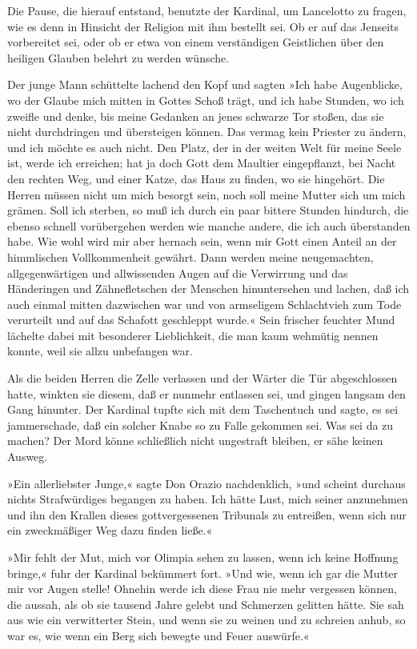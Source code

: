 \pagenum{[63]}Die Pause, die hierauf entstand, benutzte der
Kardinal, um Lancelotto zu fragen, wie es denn in Hinsicht der
Religion mit ihm bestellt sei. Ob er auf das Jenseits vorbereitet
sei, oder ob er etwa von einem verständigen Geistlichen über den
heiligen Glauben belehrt zu werden wünsche.

Der junge Mann schüttelte lachend den Kopf und sagten »Ich habe
Augenblicke, wo der Glaube mich mitten in Gottes Schoß trägt, und
ich habe Stunden, wo ich zweifle und denke, bis meine Gedanken an
jenes schwarze Tor stoßen, das sie nicht durchdringen und
übersteigen können. Das vermag kein Priester zu ändern, und ich
möchte es auch nicht. Den Platz, der in der weiten Welt für meine
Seele ist, werde ich erreichen; hat ja doch Gott dem Maultier
eingepflanzt, bei Nacht den rechten Weg, und einer Katze, das Haus
zu finden, wo sie hingehört. Die Herren müssen nicht um mich
besorgt sein, noch soll meine Mutter sich um mich grämen. Soll ich
sterben, so muß ich durch ein paar bittere Stunden hindurch, die
ebenso schnell vorübergehen werden wie manche andere, die ich auch
überstanden habe. Wie wohl wird mir aber hernach sein, wenn mir
Gott einen Anteil an der himmlischen Vollkommenheit gewährt. Dann
werden meine neugemachten, allgegenwärtigen und allwissenden Augen
auf die Verwirrung und das Händeringen und Zähnefletschen der
Menschen hinuntersehen und lachen, daß ich auch einmal mitten
dazwischen war und von armseligem Schlachtvieh zum Tode verurteilt
und auf das Schafott geschleppt wurde.« Sein frischer feuchter Mund
lächelte dabei mit besonderer Lieblichkeit, die man kaum wehmütig
nennen konnte, weil sie allzu unbefangen war.

Als die beiden Herren die Zelle verlassen und der Wärter die Tür
abgeschlossen hatte, winkten sie diesem, daß er\pagenum{[64]}
nunmehr entlassen sei, und gingen langsam den Gang hinunter. Der
Kardinal tupfte sich mit dem Taschentuch und sagte, es sei
jammerschade, daß ein solcher Knabe so zu Falle gekommen sei. Was
sei da zu machen? Der Mord könne schließlich nicht ungestraft
bleiben, er sähe keinen Ausweg.

»Ein allerliebster Junge,« sagte Don Orazio nachdenklich, »und
scheint durchaus nichts Strafwürdiges begangen zu haben. Ich hätte
Lust, mich seiner anzunehmen und ihn den Krallen dieses
gottvergessenen Tribunals zu entreißen, wenn sich nur ein
zweckmäßiger Weg dazu finden ließe.«

»Mir fehlt der Mut, mich vor Olimpia sehen zu lassen, wenn ich
keine Hoffnung bringe,« fuhr der Kardinal bekümmert fort. »Und wie,
wenn ich gar die Mutter mir vor Augen stelle! Ohnehin werde ich
diese Frau nie mehr vergessen können, die aussah, als ob sie
tausend Jahre gelebt und Schmerzen gelitten hätte. Sie sah aus wie
ein verwitterter Stein, und wenn sie zu weinen und zu schreien
anhub, so war es, wie wenn ein Berg sich bewegte und Feuer
auswürfe.«

